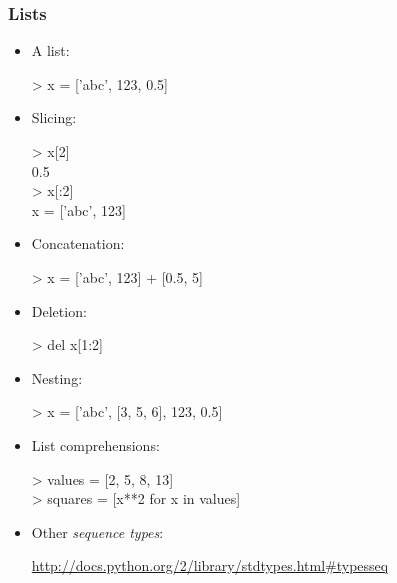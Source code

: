 \documentclass{beamer}
\newenvironment{code}{%
  \begin{exampleblock}{}
      \ttfamily
    }{%
  \end{exampleblock}
}
\begin{document}
\begin{frame}[allowframebreaks]
    \frametitle{Lists}
    \begin{itemize}
    \item A list:
        \begin{code}
            > x = ['abc', 123, 0.5]
        \end{code}
    \item Slicing:
        \begin{code}
            > x[2]\\
            0.5\\
            > x[:2]\\
            x = ['abc', 123]
        \end{code}
    \item Concatenation:
        \begin{code}
            > x = ['abc', 123] + [0.5, 5]
        \end{code}
    \item Deletion:
        \begin{code}
            > del x[1:2]
        \end{code}
    \item Nesting:
        \begin{code}
            > x = ['abc', [3, 5, 6], 123, 0.5]
        \end{code}
    \item List comprehensions:
        \begin{code}
            > values = [2, 5, 8, 13]\\
            > squares = [x**2 for x in values]
        \end{code}
    \item Other \emph{sequence types}:
        \begin{block}{}
            \url{http://docs.python.org/2/library/stdtypes.html\#typesseq}
        \end{block}
    \end{itemize}
\end{frame}
\end{document}
